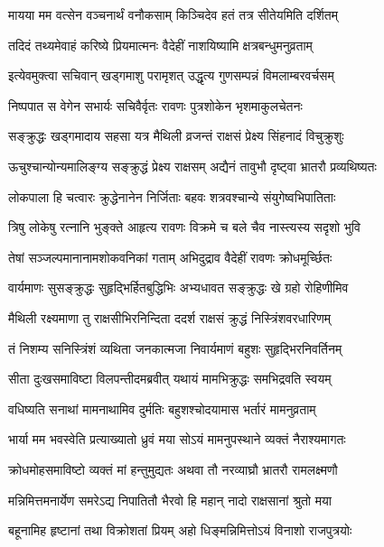 \twolineshloka
{मायया मम वत्सेन वञ्चनार्थं वनौकसाम्}
{किञ्चिदेव हतं तत्र सीतेयमिति दर्शितम्} %

\twolineshloka
{तदिदं तथ्यमेवाहं करिष्ये प्रियमात्मनः}
{वैदेहीं नाशयिष्यामि क्षत्रबन्धुमनुव्रताम्} %

\twolineshloka
{इत्येवमुक्त्वा सचिवान् खड्गमाशु परामृशत्}
{उद्धृत्य गुणसम्पन्नं विमलाम्बरवर्चसम्} %

\twolineshloka
{निष्पपात स वेगेन सभार्यः सचिवैर्वृतः}
{रावणः पुत्रशोकेन भृशमाकुलचेतनः} %

\twolineshloka
{सङ्क्रुद्धः खड्गमादाय सहसा यत्र मैथिली}
{व्रजन्तं राक्षसं प्रेक्ष्य सिंहनादं विचुक्रुशुः} %

\twolineshloka
{ऊचुश्चान्योन्यमालिङ्ग्य सङ्क्रुद्धं प्रेक्ष्य राक्षसम्}
{अद्यैनं तावुभौ दृष्ट्वा भ्रातरौ प्रव्यथिष्यतः} %

\twolineshloka
{लोकपाला हि चत्वारः क्रुद्धेनानेन निर्जिताः}
{बहवः शत्रवश्चान्ये संयुगेष्वभिपातिताः} %

\twolineshloka
{त्रिषु लोकेषु रत्नानि भुङ्क्ते आहृत्य रावणः}
{विक्रमे च बले चैव नास्त्यस्य सदृशो भुवि} %

\twolineshloka
{तेषां सञ्जल्पमानानामशोकवनिकां गताम्}
{अभिदुद्राव वैदेहीं रावणः क्रोधमूर्च्छितः} %

\twolineshloka
{वार्यमाणः सुसङ्क्रुद्धः सुहृद्भिर्हितबुद्धिभिः}
{अभ्यधावत सङ्क्रुद्धः खे ग्रहो रोहिणीमिव} %

\twolineshloka
{मैथिली रक्ष्यमाणा तु राक्षसीभिरनिन्दिता}
{ददर्श राक्षसं क्रुद्धं निस्त्रिंशवरधारिणम्} %

\twolineshloka
{तं निशम्य सनिस्त्रिंशं व्यथिता जनकात्मजा}
{निवार्यमाणं बहुशः सुहृद्भिरनिवर्तिनम्} %

\twolineshloka
{सीता दुःखसमाविष्टा विलपन्तीदमब्रवीत्}
{यथायं मामभिक्रुद्धः समभिद्रवति स्वयम्} %

\twolineshloka
{वधिष्यति सनाथां मामनाथामिव दुर्मतिः}
{बहुशश्चोदयामास भर्तारं मामनुव्रताम्} %

\twolineshloka
{भार्या मम भवस्वेति प्रत्याख्यातो ध्रुवं मया}
{सोऽयं मामनुपस्थाने व्यक्तं नैराश्यमागतः} %

\twolineshloka
{क्रोधमोहसमाविष्टो व्यक्तं मां हन्तुमुद्यतः}
{अथवा तौ नरव्याघ्रौ भ्रातरौ रामलक्ष्मणौ} %

\twolineshloka
{मन्निमित्तमनार्येण समरेऽद्य निपातितौ}
{भैरवो हि महान् नादो राक्षसानां श्रुतो मया} %

\twolineshloka
{बहूनामिह हृष्टानां तथा विक्रोशतां प्रियम्}
{अहो धिङ्मन्निमित्तोऽयं विनाशो राजपुत्रयोः} %

